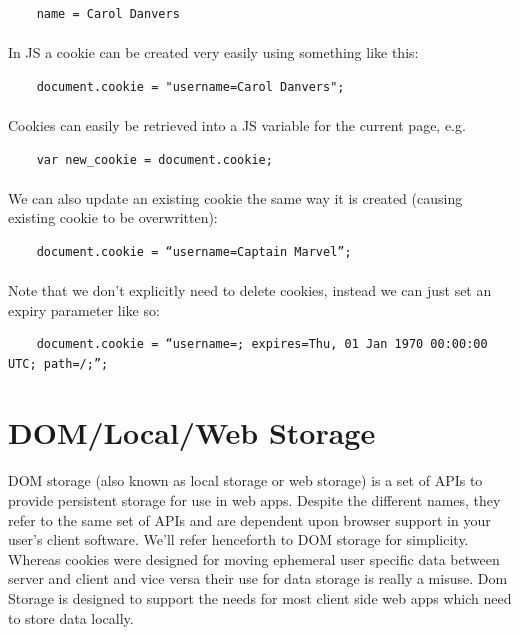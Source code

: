 \begin{lstlisting}
	name = Carol Danvers
\end{lstlisting}

\paragraph{} In JS a cookie can be created very easily using something like this:

\begin{lstlisting}
	document.cookie = "username=Carol Danvers";
\end{lstlisting}

\paragraph{} Cookies can easily be retrieved into a JS variable for the current page, e.g.

\begin{lstlisting}
	var new_cookie = document.cookie;
\end{lstlisting}

\paragraph{} We can also update an existing cookie the same way it is created (causing existing cookie to be overwritten):

\begin{lstlisting}
	document.cookie = “username=Captain Marvel”;
\end{lstlisting}

\paragraph{} Note that we don’t explicitly need to delete cookies, instead we can just set an expiry parameter like so:

\begin{lstlisting}
	document.cookie = “username=; expires=Thu, 01 Jan 1970 00:00:00 UTC; path=/;”;
\end{lstlisting}


\section{DOM/Local/Web Storage}
\paragraph{} DOM storage (also known as local storage or web storage) is a set of APIs to provide persistent storage for use in web apps. Despite the different names, they refer to the same set of APIs and are dependent upon browser support in your user’s client software. We'll refer henceforth to DOM storage for simplicity. Whereas cookies were designed for moving ephemeral user specific data between server and client and vice versa their use for data storage is really a misuse. Dom Storage is designed to support the needs for most client side web apps which need to store data locally.
